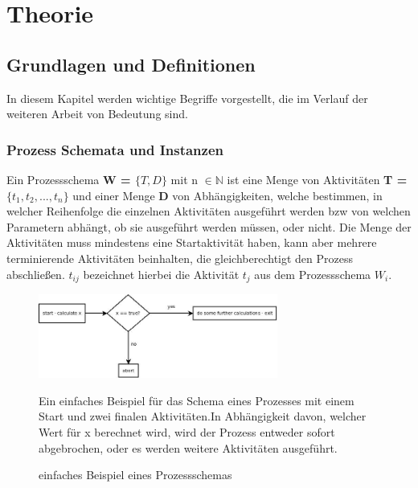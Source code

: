 
\chapter{Theorie} %

\label{Chapter4} %



\section{Grundlagen und Definitionen}
In diesem Kapitel werden wichtige Begriffe vorgestellt, die im Verlauf der weiteren Arbeit von Bedeutung sind.

\subsection{Prozess Schemata und Instanzen}

Ein Prozessschema \textbf{W = $\{T,D\}$} mit n $\in \mathbb{N}$ ist eine Menge von Aktivitäten \textbf{T = $\{t_1,t_2,...,t_n\}$} und einer Menge \textbf{D} von Abhängigkeiten, welche bestimmen, in welcher Reihenfolge die einzelnen Aktivitäten ausgeführt werden bzw von welchen Parametern abhängt, ob sie ausgeführt werden müssen, oder nicht. Die Menge der Aktivitäten muss mindestens eine Startaktivität haben, kann aber mehrere terminierende Aktivitäten beinhalten, die gleichberechtigt den Prozess abschließen.
$t_{ij}$ bezeichnet hierbei die Aktivität $t_j$ aus dem Prozessschema $W_i$. \\

\begin{figure}[ht]
	\centering
  \includegraphics[width=0.7\textwidth]{Figures/sampleW}
	\caption{einfaches Beispiel eines Prozessschemas}
Ein einfaches Beispiel für das Schema eines Prozesses mit einem Start und zwei finalen Aktivitäten.In Abhängigkeit davon, welcher Wert für x berechnet wird, wird der Prozess entweder sofort abgebrochen, oder es werden weitere Aktivitäten ausgeführt.
	\label{fig2}
\end{figure}

